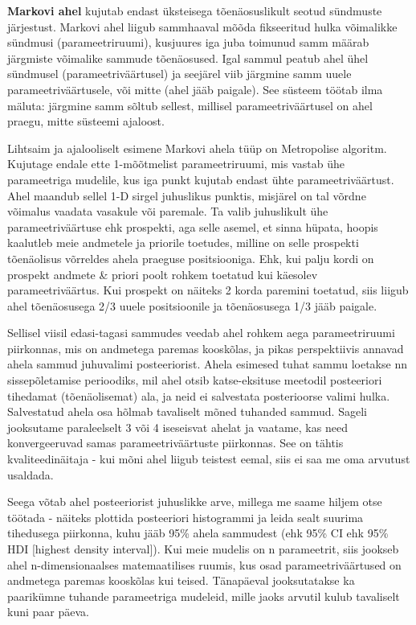 \documentclass[]{book}
\begin{document}
\textbf{Markovi ahel} kujutab endast üksteisega tõenäosuslikult seotud
sündmuste järjestust. Markovi ahel liigub sammhaaval mõõda fikseeritud
hulka võimalikke sündmusi (parameetriruumi), kusjuures iga juba toimunud
samm määrab järgmiste võimalike sammude tõenäosused. Igal sammul peatub
ahel ühel sündmusel (parameetriväärtusel) ja seejärel viib järgmine samm
uuele parameetriväärtusele, või mitte (ahel jääb paigale). See süsteem
töötab ilma mäluta: järgmine samm sõltub sellest, millisel
parameetriväärtusel on ahel praegu, mitte süsteemi ajaloost.

Lihtsaim ja ajalooliselt esimene Markovi ahela tüüp on Metropolise
algoritm. Kujutage endale ette 1-mõõtmelist parameetriruumi, mis vastab
ühe parameetriga mudelile, kus iga punkt kujutab endast ühte
parameetriväärtust. Ahel maandub sellel 1-D sirgel juhuslikus punktis,
misjärel on tal võrdne võimalus vaadata vasakule või paremale. Ta valib
juhuslikult ühe parameetriväärtuse ehk prospekti, aga selle asemel, et
sinna hüpata, hoopis kaalutleb meie andmetele ja priorile toetudes,
milline on selle prospekti tõenäolisus võrreldes ahela praeguse
positsiooniga. Ehk, kui palju kordi on prospekt andmete \& priori poolt
rohkem toetatud kui käesolev parameetriväärtus. Kui prospekt on näiteks
2 korda paremini toetatud, siis liigub ahel tõenäosusega 2/3 uuele
positsioonile ja tõenäosusega 1/3 jääb paigale.

Sellisel viisil edasi-tagasi sammudes veedab ahel rohkem aega
parameetriruumi piirkonnas, mis on andmetega paremas kooskõlas, ja pikas
perspektiivis annavad ahela sammud juhuvalimi posteeriorist. Ahela
esimesed tuhat sammu loetakse nn sissepõletamise perioodiks, mil ahel
otsib katse-eksituse meetodil posteeriori tihedamat (tõenäolisemat) ala,
ja neid ei salvestata posterioorse valimi hulka. Salvestatud ahela osa
hõlmab tavaliselt mõned tuhanded sammud. Sageli jooksutame paraleelselt
3 või 4 iseseisvat ahelat ja vaatame, kas need konvergeeruvad samas
parameetriväärtuste piirkonnas. See on tähtis kvaliteedinäitaja - kui
mõni ahel liigub teistest eemal, siis ei saa me oma arvutust usaldada.

Seega võtab ahel posteeriorist juhuslikke arve, millega me saame hiljem
otse töötada - näiteks plottida posteeriori histogrammi ja leida sealt
suurima tihedusega piirkonna, kuhu jääb 95\% ahela sammudest (ehk 95\%
CI ehk 95\% HDI {[}highest density interval{]}). Kui meie mudelis on n
parameetrit, siis jookseb ahel n-dimensionaalses matemaatilises ruumis,
kus osad parameetriväärtused on andmetega paremas kooskõlas kui teised.
Tänapäeval jooksutatakse ka paarikümne tuhande parameetriga mudeleid,
mille jaoks arvutil kulub tavaliselt kuni paar päeva.
\end{document}
